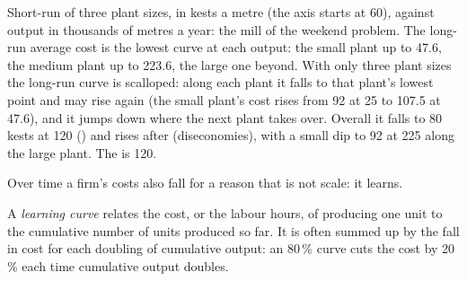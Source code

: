 \begin{omfigure}

{\small Short-run  of three plant sizes, in kests a metre (the axis starts at 60), against output in thousands of metres a year: the mill of
the weekend problem. The long-run average cost is the lowest curve at each output: the small plant up to 47.6, the medium plant up to 223.6, the large one
beyond. With only three plant sizes the long-run curve is scalloped: along each plant it falls to that plant's lowest point and may rise again
(the small plant's cost rises from 92 at 25 to 107.5 at 47.6), and it jumps down where the next plant takes over. Overall it falls to 80 kests at 120
() and rises after (diseconomies), with a small dip to 92 at 225 along the large plant. The  is 120.}
\end{omfigure}

Over time a firm's costs also fall for a reason that is not scale: it learns.

\begin{definition}\label{def:g11:production-and-costs:learning-curve}
A \emph{learning curve} relates the cost, or the labour hours, of producing one unit to the cumulative number of units produced so far. It is
often summed up by the fall in cost for each doubling of cumulative output: an 80\,\% curve cuts the cost by 20\,\% each time cumulative output doubles.
\end{definition}

